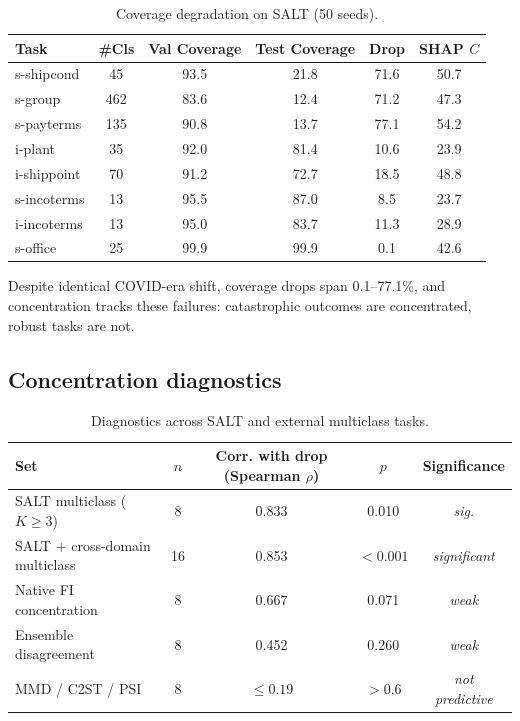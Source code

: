 \documentclass[sigconf,anonymous]{acmart}
\begin{document}
\begin{table}[t]
\centering
\caption{Coverage degradation on SALT (50 seeds).}
\label{tab:salt}
\small
\setlength{\tabcolsep}{4pt}
\begin{tabular}{lccccc}
\toprule
Task & \#Cls & Val Coverage & Test Coverage & Drop & SHAP $C$ \\
\midrule
s-shipcond & 45 & 93.5 & 21.8 & 71.6 & 50.7 \\
s-group    & 462 & 83.6 & 12.4 & 71.2 & 47.3 \\
s-payterms & 135 & 90.8 & 13.7 & 77.1 & 54.2 \\
i-plant    & 35 & 92.0 & 81.4 & 10.6 & 23.9 \\
i-shippoint& 70 & 91.2 & 72.7 & 18.5 & 48.8 \\
s-incoterms & 13 & 95.5 & 87.0 & 8.5  & 23.7 \\
i-incoterms & 13 & 95.0 & 83.7 & 11.3 & 28.9 \\
s-office   & 25 & 99.9 & 99.9 & 0.1  & 42.6 \\
\bottomrule
\end{tabular}
\normalsize
\end{table}

Despite identical COVID-era shift, coverage drops span 0.1--77.1\%, and concentration tracks these failures: catastrophic outcomes are concentrated, robust tasks are not.

\subsection{Concentration diagnostics}

\begin{table}[t]
\centering
\caption{Diagnostics across SALT and external multiclass tasks.}
\label{tab:diagnostics}
\small
\setlength{\tabcolsep}{4pt}
\begin{tabular}{lcccc}
\toprule
Set & $n$ & Corr. with drop (Spearman $\rho$) & $p$ & Significance \\
\midrule
SALT multiclass ($K\ge 3$) & 8  & 0.833 & 0.010 & \textit{sig.} \\
SALT + cross-domain multiclass & 16 & 0.853 & $<0.001$ & \textit{significant} \\
Native FI concentration & 8  & 0.667 & 0.071 & \textit{weak} \\
Ensemble disagreement  & 8  & 0.452 & 0.260 & \textit{weak} \\
MMD / C2ST / PSI & 8  & $\le 0.19$ & $>0.6$ & \textit{not predictive} \\
\bottomrule
\end{tabular}
\normalsize
\end{table}
\end{document}
